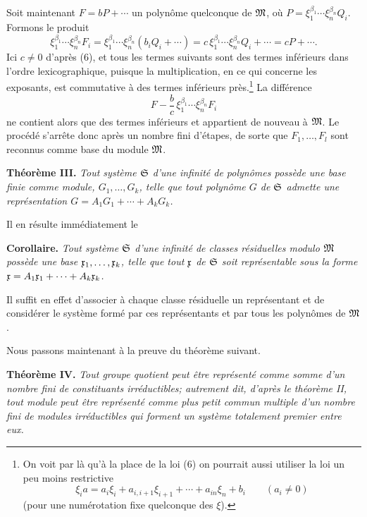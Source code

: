 Soit maintenant $F=bP+\cdots$ un polynôme quelconque de $\mathfrak{M}$, où $P=\xi_1^{\beta_1}\cdots\xi_n^{\beta_n}Q_i$. Formons le produit
\[
 \xi_1^{\beta_1}\cdots\xi_n^{\beta_n}F_i
 =\xi_1^{\beta_1}\cdots\xi_n^{\beta_n}(b_iQ_i+\cdots)
 =c\,\xi_1^{\beta_1}\cdots\xi_n^{\beta_n}Q_i+\cdots
 =cP+\cdots.
\]
Ici $c\ne0$ d'après (6), et tous les termes suivants sont des termes inférieurs dans l'ordre lexicographique, puisque la multiplication, en ce qui concerne les exposants, est commutative à des termes inférieurs près.\footnote{On voit par là qu'à la place de la loi (6) on pourrait aussi utiliser la loi un peu moins restrictive
\[
 \xi_i a=a_i\xi_i+a_{i,i+1}\xi_{i+1}+\cdots+a_{in}\xi_n+b_i\qquad(a_i\ne0)
\]
(pour une numérotation fixe quelconque des $\xi$).} La différence
\[
 F-\frac bc\,\xi_1^{\beta_1}\cdots\xi_n^{\beta_n}F_i
\]
ne contient alors que des termes inférieurs et appartient de nouveau à $\mathfrak{M}$. Le procédé s'arrête donc après un nombre fini d'étapes, de sorte que $F_1,\ldots,F_l$ sont reconnus comme base du module $\mathfrak{M}$.

\textbf{Théorème III.} \emph{Tout système $\mathfrak{S}$ d'une infinité de polynômes possède une base finie comme module, $G_1,\ldots,G_k$, telle que tout polynôme $G$ de $\mathfrak{S}$ admette une représentation $G=A_1G_1+\cdots+A_kG_k$.}

Il en résulte immédiatement le

\textbf{Corollaire.} \emph{Tout système $\mathfrak{S}$ d'une infinité de classes résiduelles modulo $\mathfrak{M}$ possède une base $\mathfrak{x}_1,\ldots,\mathfrak{x}_k$, telle que tout $\mathfrak{x}$ de $\mathfrak{S}$ soit représentable sous la forme $\mathfrak{x}=A_1\mathfrak{x}_1+\cdots+A_k\mathfrak{x}_k$.}

Il suffit en effet d'associer à chaque classe résiduelle un représentant et de considérer le système formé par ces représentants et par tous les polynômes de $\mathfrak{M}$.

Nous passons maintenant à la preuve du théorème suivant.

\textbf{Théorème IV.} \emph{Tout groupe quotient peut être représenté comme somme d'un nombre fini de constituants irréductibles; autrement dit, d'après le théorème II, tout module peut être représenté comme plus petit commun multiple d'un nombre fini de modules irréductibles qui forment un système totalement premier entre eux.}

